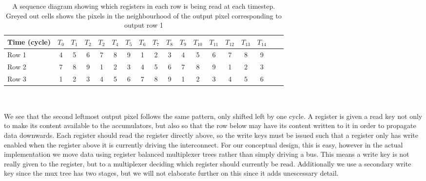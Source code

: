 \\ \\
\begin{table}[h]
    \begin{tabular}{l*{16}{c}r}
            Time (cycle)        & $T_{0}$ & $T_{1}$ & $T_{2}$ & $T_{2}$ & $T_{4}$  & $T_{5}$ & $T_{6}$ & $T_{7}$ & $T_{8}$ & $T_{9}$ & $T_{10}$ & $T_{11}$ & $T_{12}$ & $T_{13}$ & $T_{14}$\\
        \hline
        Row 1                   & \cellcolor{gray75} 4 & 5 & 6 & 7 & 8 & 9 & 1 & \cellcolor{gray75} 2 & \cellcolor{gray75} 3 & 4\cellcolor{gray75} & 5 & 6 & 7 & 8 & 9 & \\
        Row 2                   & 7 & 8 & 9 & 1 & \cellcolor{gray75} 2 & \cellcolor{gray75} 3 & \cellcolor{gray75}4 & 5 & 6 & 7 & 8 & 9 & 1 & \cellcolor{gray75} 2 & \cellcolor{gray75} 3 & \\
        Row 3                   & 1 & \cellcolor{gray75} 2 & \cellcolor{gray75} 3 & 4\cellcolor{gray75} & 5 & 6 & 7 & 8 & 9 & 1 & \cellcolor{gray75} 2 & \cellcolor{gray75} 3 & 4\cellcolor{gray75} & 5 & 6 & \\
    \end{tabular}
    \caption{A sequence diagram showing which registers in each row is being read at each timestep. Greyed out cells shows the pixels in the neighbourhood of the output pixel corresponding to output row 1}
    \label{tbl:timing2}
\end{table}
\\ \\
We see that the second leftmost output pixel follows the same pattern, only shifted left by one cycle.
A register is given a read key not only to make its content available to the accumulators, but also so that the row below may have its content written to it in order to propagate data downwards.
Each register should read the register directly above, so the write keys must be issued such that a register only has write enabled when the register above it is currently driving the interconnect.
For our conceptual design, this is easy, however in the actual implementation we move data using register balanced multiplexer trees rather than simply driving a bus.
This means a write key is not really given to the register, but to a multiplexer deciding which register should currently be read.
Additionally we use a secondary write key since the mux tree has two stages, but we will not elaborate further on this since it adds unescessary detail.


